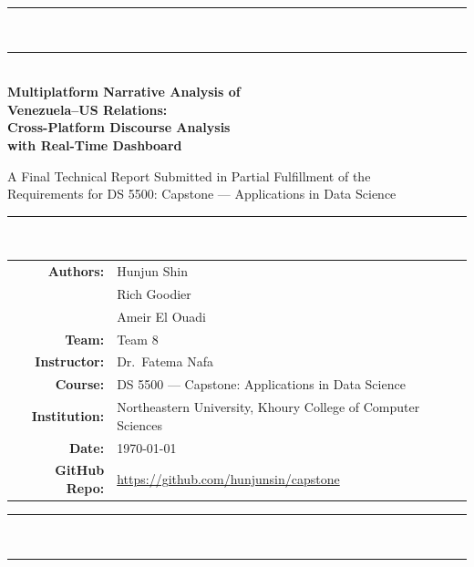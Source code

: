 \documentclass[12pt, letterpaper]{article}
\begin{document}
\begin{titlepage}
  \centering
  \vspace*{1cm}

  {\color{NUred}\rule{\linewidth}{3pt}}\\[0.4cm]
  {\color{NUdark}\rule{\linewidth}{1pt}}\\[1.5cm]

  {\Huge\bfseries\color{NUdark}
    Multiplatform Narrative Analysis of\\Venezuela--US Relations:\\[0.3cm]
    Cross-Platform Discourse Analysis\\with Real-Time Dashboard\\[0.5cm]
  }

  {\large\color{NUdark}
    A Final Technical Report Submitted in Partial Fulfillment of the\\
    Requirements for DS 5500: Capstone --- Applications in Data Science
  }\\[1.5cm]

  {\color{NUdark}\rule{\linewidth}{1pt}}\\[0.8cm]

  \begin{tabular}{rl}
    \textbf{Authors:}       & Hunjun Shin \\
                            & Rich Goodier \\
                            & Ameir El Ouadi \\[0.4cm]
    \textbf{Team:}          & Team 8 \\[0.2cm]
    \textbf{Instructor:}    & Dr.\ Fatema Nafa \\[0.2cm]
    \textbf{Course:}        & DS 5500 --- Capstone: Applications in Data Science \\[0.2cm]
    \textbf{Institution:}   & Northeastern University, Khoury College of Computer Sciences \\[0.2cm]
    \textbf{Date:}          & \today \\[0.4cm]
    \textbf{GitHub Repo:}   & \url{https://github.com/hunjunsin/capstone} \\
  \end{tabular}

  \vspace{1.5cm}
  {\color{NUdark}\rule{\linewidth}{1pt}}\\[0.3cm]
  {\color{NUred}\rule{\linewidth}{3pt}}

  \vfill
\end{titlepage}
\end{document}

